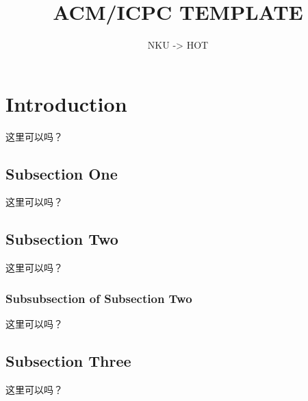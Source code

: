 \documentclass{article}
\begin{document}
  
\title{ACM/ICPC TEMPLATE}  
\author{NKU -> HOT}  
\maketitle
\tableofcontents
\section{Introduction}
这里可以吗？
\subsection{Subsection One}
这里可以吗？
\subsection{Subsection Two}
这里可以吗？
\subsubsection{Subsubsection of Subsection Two}
这里可以吗？
\subsection*{Subsection Three}
这里可以吗？
\end{document}
